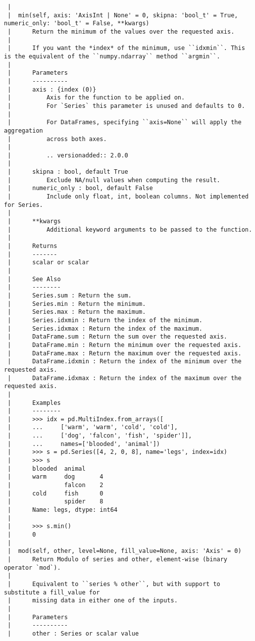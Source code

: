 \documentclass[
  letterpaper,
  DIV=11,
  numbers=noendperiod]{scrreprt}
\begin{document}
\begin{verbatim}
 |  
 |  min(self, axis: 'AxisInt | None' = 0, skipna: 'bool_t' = True, numeric_only: 'bool_t' = False, **kwargs)
 |      Return the minimum of the values over the requested axis.
 |      
 |      If you want the *index* of the minimum, use ``idxmin``. This is the equivalent of the ``numpy.ndarray`` method ``argmin``.
 |      
 |      Parameters
 |      ----------
 |      axis : {index (0)}
 |          Axis for the function to be applied on.
 |          For `Series` this parameter is unused and defaults to 0.
 |      
 |          For DataFrames, specifying ``axis=None`` will apply the aggregation
 |          across both axes.
 |      
 |          .. versionadded:: 2.0.0
 |      
 |      skipna : bool, default True
 |          Exclude NA/null values when computing the result.
 |      numeric_only : bool, default False
 |          Include only float, int, boolean columns. Not implemented for Series.
 |      
 |      **kwargs
 |          Additional keyword arguments to be passed to the function.
 |      
 |      Returns
 |      -------
 |      scalar or scalar
 |      
 |      See Also
 |      --------
 |      Series.sum : Return the sum.
 |      Series.min : Return the minimum.
 |      Series.max : Return the maximum.
 |      Series.idxmin : Return the index of the minimum.
 |      Series.idxmax : Return the index of the maximum.
 |      DataFrame.sum : Return the sum over the requested axis.
 |      DataFrame.min : Return the minimum over the requested axis.
 |      DataFrame.max : Return the maximum over the requested axis.
 |      DataFrame.idxmin : Return the index of the minimum over the requested axis.
 |      DataFrame.idxmax : Return the index of the maximum over the requested axis.
 |      
 |      Examples
 |      --------
 |      >>> idx = pd.MultiIndex.from_arrays([
 |      ...     ['warm', 'warm', 'cold', 'cold'],
 |      ...     ['dog', 'falcon', 'fish', 'spider']],
 |      ...     names=['blooded', 'animal'])
 |      >>> s = pd.Series([4, 2, 0, 8], name='legs', index=idx)
 |      >>> s
 |      blooded  animal
 |      warm     dog       4
 |               falcon    2
 |      cold     fish      0
 |               spider    8
 |      Name: legs, dtype: int64
 |      
 |      >>> s.min()
 |      0
 |  
 |  mod(self, other, level=None, fill_value=None, axis: 'Axis' = 0)
 |      Return Modulo of series and other, element-wise (binary operator `mod`).
 |      
 |      Equivalent to ``series % other``, but with support to substitute a fill_value for
 |      missing data in either one of the inputs.
 |      
 |      Parameters
 |      ----------
 |      other : Series or scalar value

\end{verbatim}
\end{document}

